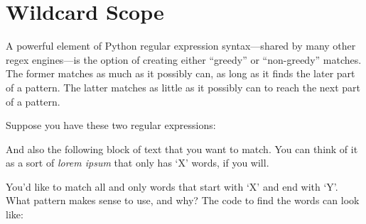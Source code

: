\newpage

\hypertarget{wildcard-scope}{%
\section{Wildcard Scope}\label{wildcard-scope}}

A powerful element of Python regular expression syntax---shared by many
other regex engines---is the option of creating either ``greedy'' or
``non-greedy'' matches. The former matches as much as it possibly can,
as long as it finds the later part of a pattern. The latter matches as
little as it possibly can to reach the next part of a pattern.

Suppose you have these two regular expressions:

\begin{Shaded}
\begin{Highlighting}[]
\OperatorTok{=}\NormalTok{(}\NormalTok{)    }
\OperatorTok{=}\NormalTok{(}\NormalTok{)   }
\end{Highlighting}
\end{Shaded}

And also the following block of text that you want to match. You can
think of it as a sort of \emph{lorem ipsum} that only has `X' words, if
you will.

\begin{Shaded}
\begin{Highlighting}[]
\OperatorTok{=} 
\end{Highlighting}
\end{Shaded}

You'd like to match all and only words that start with `X' and end with
`Y'. What pattern makes sense to use, and why? The code to find the
words can look like:

